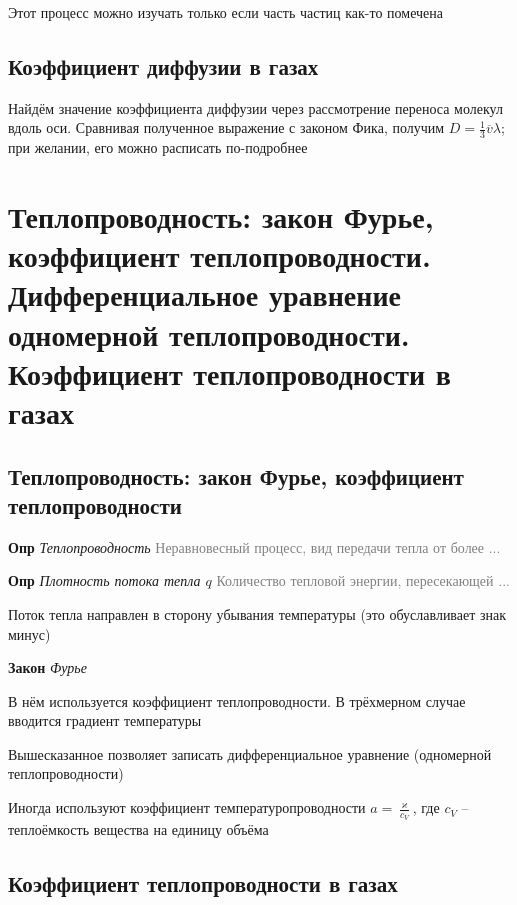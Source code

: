 \documentclass[a4paper, 14pt]{article}
\begin{document}
    Этот процесс можно изучать только если часть частиц как-то помечена

    \subsection{Коэффициент диффузии в газах}

    Найдём значение коэффициента диффузии через рассмотрение переноса молекул вдоль оси.
    Сравнивая полученное выражение с законом Фика, получим $D = \frac{1}{3} \overline{v}\lambda$; при
    желании, его можно расписать по-подробнее

    \section{Теплопроводность: закон Фурье, коэффициент теплопроводности. Дифференциальное уравнение одномерной
    теплопроводности.
    Коэффициент теплопроводности в газах}

    \subsection{Теплопроводность: закон Фурье, коэффициент теплопроводности}

    \textbf{Опр} \textit{Теплопроводность} \textcolor{gray}{Неравновесный процесс, вид передачи тепла от более ...}

    \textbf{Опр} \textit{Плотность потока тепла $q$} \textcolor{gray}{Количество тепловой энергии, пересекающей ...}

    Поток тепла направлен в сторону убывания температуры (это обуславливает знак минус)

    \textbf{Закон} \textit{Фурье}

    В нём используется коэффициент теплопроводности.
    В трёхмерном случае вводится градиент температуры

    Вышесказанное позволяет записать дифференциальное уравнение (одномерной теплопроводности)

    Иногда используют коэффициент температуропроводности $a = \frac{\varkappa}{c_V}$, где $c_V$ -- теплоёмкость
    вещества на единицу объёма

    \subsection{Коэффициент теплопроводности в газах}
\end{document}
